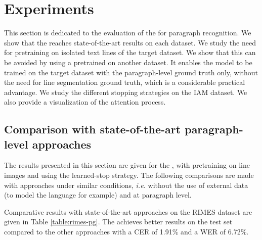 \section{Experiments}
\label{section-experiments}
\renewcommand{\thefootnote}{\alph{footnote}}

This section is dedicated to the evaluation of the \modelname{} for paragraph recognition. We show that the \modelacc{} reaches state-of-the-art results on each dataset. We study the need for pretraining on isolated text lines of the target dataset. We show that this can be avoided by using a pretrained \modelacc{} on another dataset. It enables the model to be trained on the target dataset with the paragraph-level ground truth only, without the need for line segmentation ground truth, which is a considerable practical advantage. We study the different stopping strategies on the IAM dataset. We also provide a visualization of the attention process.


\subsection{Comparison with state-of-the-art paragraph-level approaches}
\label{section-exp-pg-sota}
The results presented in this section are given for the \modelacc{}, with pretraining on line images and using the learned-stop strategy. The following comparisons are made with approaches under similar conditions, \textit{i.e.} without the use of external data (to model the language for example) and at paragraph level.

Comparative results with state-of-the-art approaches on the RIMES dataset are given in Table \ref{table:rimes-pg}. The \modelacc{} achieves better results on the test set compared to the other approaches with a CER of 1.91\% and a WER of 6.72\%. 


